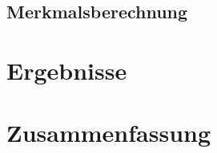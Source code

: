 \documentclass[11pt,final,journal,a4paper,towside,towcolumn]{IEEEtran}
\begin{document}
\subsection{Merkmalsberechnung}

\section{Ergebnisse}

\section{Zusammenfassung}

{}

\end{document}
